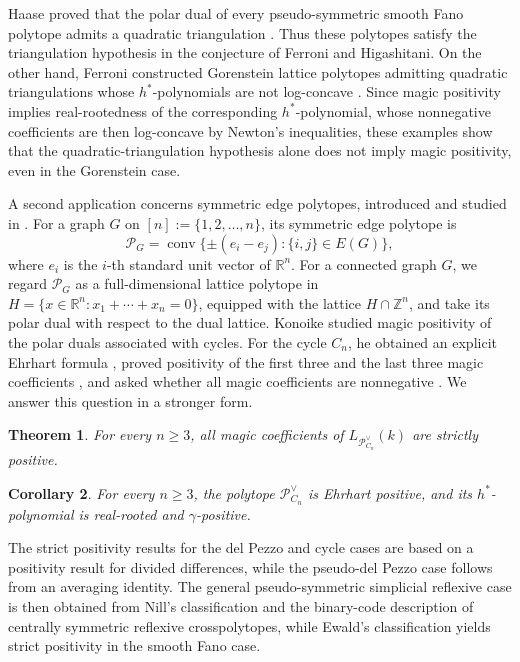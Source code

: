 \documentclass[12pt]{amsart}
\newtheorem{Theorem}{Theorem}[section]
\newtheorem{Corollary}[Theorem]{Corollary}
\theoremstyle{definition}
\newcommand{\ZZ}{\mathbb Z}
\newcommand{\RR}{\mathbb R}
\newcommand{\conv}{\operatorname{conv}}
\newcommand{\PP}{\mathcal P}
\begin{document}
Haase proved that the polar dual of every pseudo-symmetric smooth Fano
polytope admits a quadratic triangulation
\cite[Corollaries~IV.2.6 and~IV.2.10]{HaaseThesis}.
Thus these polytopes satisfy the triangulation hypothesis in the
conjecture of Ferroni and Higashitani.
On the other hand, Ferroni constructed Gorenstein lattice polytopes
admitting quadratic triangulations whose $h^*$-polynomials are not
log-concave \cite[Theorem~1.4 and Section~6]{FerroniShenanigans}.
Since magic positivity implies real-rootedness of the corresponding
$h^*$-polynomial, whose nonnegative coefficients are then log-concave
by Newton's inequalities, these examples show that the
quadratic-triangulation hypothesis alone does not imply magic
positivity, even in the Gorenstein case.

A second application concerns symmetric edge polytopes, introduced and
studied in \cite{MatsuiEtAlGraphs}.  For a graph $G$ on
$[n]:=\{1,2,\dots,n\}$, its symmetric edge polytope is
\[
\PP_G
=
\conv\{\pm(e_i-e_j):\{i,j\}\in E(G)\},
\]
where $e_i$ is the $i$-th standard unit vector of $\RR^n$.
For a connected graph $G$, we regard $\PP_G$ as a full-dimensional
lattice polytope in
$H=\{x\in\RR^n:x_1+\cdots+x_n=0\}$, equipped with the lattice
$H\cap\ZZ^n$, and take its polar dual with respect to the dual lattice.
Konoike studied magic positivity of the polar duals associated with
cycles.  For the cycle $C_n$, he obtained an explicit Ehrhart formula
\cite[Proposition~4.6]{KonoikeCycles}, proved positivity of the first
three and the last three magic coefficients
\cite[Theorem~1.4]{KonoikeCycles}, and asked whether all magic
coefficients are nonnegative
\cite[Question~4.5]{KonoikeCycles}.  We answer this question in a
stronger form.

\begin{Theorem}\label{thm:cycles}
For every $n\ge3$, all magic coefficients of
$L_{\PP_{C_n}^\vee}(k)$ are strictly positive.
\end{Theorem}

\begin{Corollary}\label{cor:cycle-consequences}
For every $n\ge3$, the polytope $\PP_{C_n}^\vee$ is Ehrhart positive,
and its $h^*$-polynomial is real-rooted and $\gamma$-positive.
\end{Corollary}

The strict positivity results for the del Pezzo and cycle cases are
based on a positivity result for divided differences, while the
pseudo-del Pezzo case follows from an averaging identity.
The general pseudo-symmetric simplicial reflexive case is then obtained
from Nill's classification and the binary-code description of centrally
symmetric reflexive crosspolytopes, while Ewald's classification yields
strict positivity in the smooth Fano case.
\end{document}
